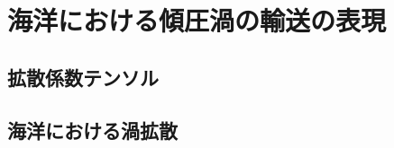 \documentclass[a4j,12pt,openbib,oneside]{jreport}
\begin{document}
\tableofcontents

\chapter{海洋における傾圧渦の輸送の表現}


\section{拡散係数テンソル}


\section{海洋における渦拡散}





\newpage



\end{document}

